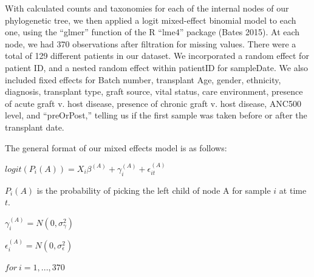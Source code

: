 \documentclass[12pt,twoside]{dukestatscithesis}
\begin{document}
With calculated counts and taxonomies for each of the internal nodes of
our phylogenetic tree, we then applied a logit mixed-effect binomial
model to each one, using the ``glmer'' function of the R ``lme4''
package (Bates 2015). At each node, we had 370 observations after
filtration for missing values. There were a total of 129 different
patients in our dataset. We incorporated a random effect for patient ID,
and a nested random effect within patientID for sampleDate. We also
included fixed effects for Batch number, transplant Age, gender,
ethnicity, diagnosis, transplant type, graft source, vital status, care
environment, presence of acute graft v. host disease, presence of
chronic graft v. host disease, ANC500 level, and ``preOrPost,'' telling
us if the first sample was taken before or after the transplant date.

The general format of our mixed effects model is as follows:

\(logit(P_{i}(A)) = X_{i}\beta^{(A)} + \gamma_{i}^{(A)} + \epsilon_{it}^{(A)}\)

\(P_{i}(A)\) is the probability of picking the left child of node A for
sample \(i\) at time \(t\).

\(\gamma_{i}^{(A)} = N(0, \sigma_{\gamma}^{2})\)

\(\epsilon_{i}^{(A)} = N(0, \sigma_{\epsilon}^{2})\)

\(for \ i = 1,...,370\)
\end{document}
